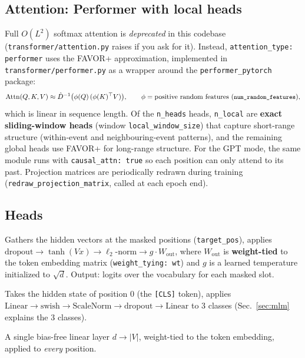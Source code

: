 \documentclass[11pt,a4paper]{article}
\newcommand{\file}[1]{\texttt{\small #1}}
\newcommand{\code}[1]{\texttt{\small #1}}
\begin{document}
\subsection{Attention: Performer with local heads}
Full $O(L^2)$ softmax attention is \emph{deprecated} in this codebase
(\file{transformer/attention.py} raises if you ask for it). Instead,
\code{attention\_type: performer} uses the FAVOR+ approximation, implemented
in \file{transformer/performer.py} as a wrapper around the
\code{performer\_pytorch} package:
\[
\mathrm{Attn}(Q,K,V) \approx \hat{D}^{-1}\big(\phi(Q)\,(\phi(K)^\top V)\big),
\qquad \phi = \text{positive random features (\code{num\_random\_features})},
\]
which is linear in sequence length. Of the \code{n\_heads} heads,
\code{n\_local} are \textbf{exact sliding-window heads} (window
\code{local\_window\_size}) that capture short-range structure (within-event and
neighbouring-event patterns), and the remaining global heads use FAVOR+ for
long-range structure. For the GPT mode, the same module runs with
\code{causal\_attn: true} so each position can only attend to its past.
Projection matrices are periodically redrawn during training
(\code{redraw\_projection\_matrix}, called at each epoch end).

\subsection{Heads}
\begin{description}[nosep]
  \item[MLM decoder (\code{MaskedLanguageModel}).] Gathers the hidden vectors at
    the masked positions (\code{target\_pos}), applies
    $\mathrm{dropout} \to \tanh(Vx) \to \ell_2\text{-norm} \to g \cdot W_{\text{out}}$,
    where $W_{\text{out}}$ is \textbf{weight-tied} to the token embedding matrix
    (\code{weight\_tying: wt}) and $g$ is a learned temperature initialized to
    $\sqrt{d}$. Output: logits over the vocabulary for each masked slot.
  \item[CLS decoder (\code{CLS\_DecoderS}).] Takes the hidden state of position
    0 (the \code{[CLS]} token), applies
    $\mathrm{Linear}\to\mathrm{swish}\to\mathrm{ScaleNorm}\to\mathrm{dropout}\to\mathrm{Linear}$
    to 3 classes (Sec.~\ref{sec:mlm} explains the 3 classes).
  \item[AR LM head (\code{lm\_head}).] A single bias-free linear layer
    $d \to |V|$, weight-tied to the token embedding, applied to \emph{every}
    position.
\end{description}
\end{document}
